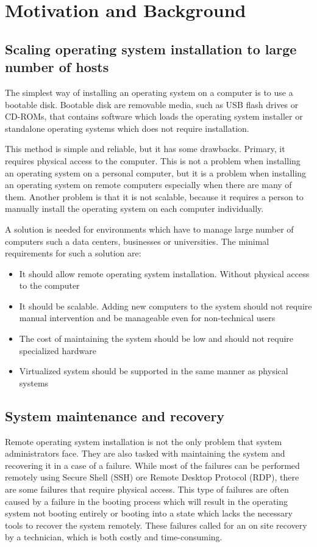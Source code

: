 \documentclass[../main.tex]{subfiles}
\begin{document}
\section{Motivation and Background}
\label{sec:motivation-and-background}

\subsection{Scaling operating system installation to large number of hosts}
The simplest way of installing an operating system on a computer is to use a bootable disk.
Bootable disk are removable media, such as USB flash drives or CD-ROMs, that contains software
which loads the operating system installer or standalone operating systems which does not require installation.

This method is simple and reliable, but it has some drawbacks. Primary, it requires physical access to the computer.
This is not a problem when installing an operating system on a personal computer, but it is a problem when installing
an operating system on remote computers especially when there are many of them. Another problem is that it is not
scalable, because it requires a person to manually install the operating system on each computer individually.

A solution is needed for environments which have to manage large number of computers such a data centers, businesses
or universities. The minimal requirements for such a solution are:
\begin{itemize}
  \item It should allow remote operating system installation. Without physical access to the computer
  \item It should be scalable. Adding new computers to the system should not require manual intervention and be manageable even for non-technical users
  \item The cost of maintaining the system should be low and should not require specialized hardware
  \item Virtualized system should be supported in the same manner as physical systems
\end{itemize}

\subsection{System maintenance and recovery}
Remote operating system installation is not the only problem that system administrators face. They are also
tasked with maintaining the system and recovering it in a case of a failure. While most of the failures can be performed
remotely using Secure Shell (SSH) ore Remote Desktop Protocol (RDP), there are some failures that require physical access.
This type of failures are often caused by a failure in the booting process which will result in the operating system
not booting entirely or booting into a state which lacks the necessary tools to recover the system remotely.
These failures called for an on site recovery by a technician, which is both costly and time-consuming.
\end{document}
